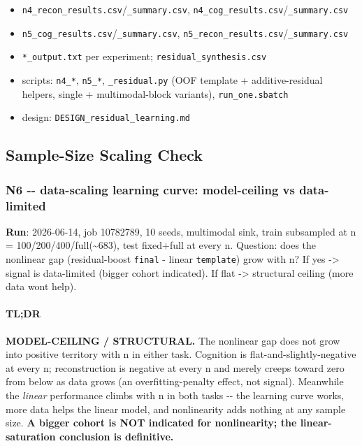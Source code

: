 \begin{itemize}
\tightlist
\item
  \texttt{n4\_recon\_results.csv}/\texttt{\_summary.csv}, \texttt{n4\_cog\_results.csv}/\texttt{\_summary.csv}
\item
  \texttt{n5\_cog\_results.csv}/\texttt{\_summary.csv}, \texttt{n5\_recon\_results.csv}/\texttt{\_summary.csv}
\item
  \texttt{*\_output.txt} per experiment; \texttt{residual\_synthesis.csv}
\item
  scripts: \texttt{n4\_*}, \texttt{n5\_*}, \texttt{\_residual.py} (OOF template + additive-residual helpers, single + multimodal-block variants), \texttt{run\_one.sbatch}
\item
  design: \texttt{DESIGN\_residual\_learning.md}
\end{itemize}

\subsection{Sample-Size Scaling Check}\label{sample-size-scaling-check}

\subsubsection{N6 -\/- data-scaling learning curve: model-ceiling vs data-limited}\label{n6----data-scaling-learning-curve-model-ceiling-vs-data-limited}

\textbf{Run}: 2026-06-14, job 10782789, 10 seeds, multimodal sink, train subsampled at n = 100/200/400/full(\textasciitilde683), test fixed+full at every n. Question: does the nonlinear gap (residual-boost \texttt{final} - linear \texttt{template}) grow with n? If yes -\textgreater{} signal is data-limited (bigger cohort indicated). If flat -\textgreater{} structural ceiling (more data won\textquotesingle t help).

\paragraph{TL;DR}\label{tldr-6}

\textbf{MODEL-CEILING / STRUCTURAL.} The nonlinear gap does not grow into positive territory with n in either task. Cognition is flat-and-slightly-negative at every n; reconstruction is negative at every n and merely creeps toward zero from below as data grows (an overfitting-penalty effect, not signal). Meanwhile the \emph{linear} performance climbs with n in both tasks -\/- the learning curve works, more data helps the linear model, and nonlinearity adds nothing at any sample size. \textbf{A bigger cohort is NOT indicated for nonlinearity; the linear-saturation conclusion is definitive.}

